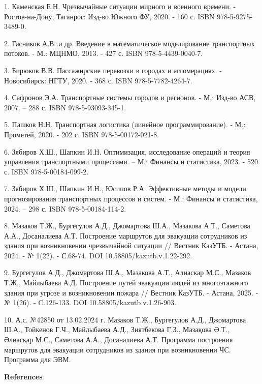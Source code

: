 \begin{refs}
1. Каменская Е.Н. Чрезвычайные ситуации мирного и военного времени. -
Ростов-на-Дону, Таганрог: Изд-во Южного ФУ, 2020. - 160 с. ISBN
978-5-9275-3489-0.

2. Гасников А.В. и др. Введение в математическое моделирование
транспортных потоков. - М.: МЦНМО, 2013. - 427 с. ISBN
978-5-4439-0040-7.

3. Бирюков В.В. Пассажирские перевозки в городах и агломерациях. -
Новосибирск: НГТУ, 2020. - 368 с. ISBN 978-5-7782-4264-7.

4. Сафронов Э.А. Транспортные системы городов и регионов. - М.: Изд-во
АСВ, 2007. -- 288 с. ISBN 978-5-93093-345-1.

5. Пашков Н.Н. Транспортная логистика (линейное программирование). - М.:
Прометей, 2020. - 202 с. ISBN 978-5-00172-021-8.

6. Зябиров Х.Ш., Шапкин И.Н. Оптимизация, исследование операций и теория
управления транспортными процессами. -- М.: Финансы и статистика, 2023.
- 520 с. ISBN 978-5-00184-099-2.

7. Зябиров Х.Ш., Шапкин И.Н., Юсипов Р.А. Эффективные методы и
модели прогнозирования транспортных процессов и систем. - М.: Финансы и
статистика, 2024. -- 298 с. ISBN 978-5-00184-114-2.

8. Мазаков Т.Ж., Бургегулов А.Д., Джомартова Ш.А., Мазакова А.Т.,
Саметова А.А., Досаналиева А.Т. Построение маршрутов для эвакуации
сотрудников из здания при возникновении чрезвычайной ситуации // Вестник
КазУТБ. - Астана, 2024. - № 1(22). - С.68-74. DOI
10.58805/kazutb.v.1.22-292.

9. Бургегулов А.Д., Джомартова Ш.А., Мазакова А.Т., Алиаскар М.С.,
Мазаков Т.Ж., Майлыбаева А.Д. Построение путей эвакуации людей из
многоэтажного здания при угрозе и возникновении пожара // Вестник
КазУТБ. - Астана, 2025. - № 1(26). - C.126-133. DOI
10.58805/kazutb.v.1.26-903.

10. А.с. №42850 от 13.02.2024 г. Мазаков Т.Ж., Бургегулов А.Д.,
Джомартова Ш.А., Тойкенов Г.Ч., Майлыбаева А.Д., Зиятбекова Г.З.,
Мазақова Ә.Т., Әлиасқар М.С., Саметова А.А., Досаналиева А.Т. Программа
построения маршрутов для эвакуации сотрудников из здания при
возникновении ЧС. Программа для ЭВМ.
\end{refs}

\begin{center}
{\bfseries References}
\end{center}


